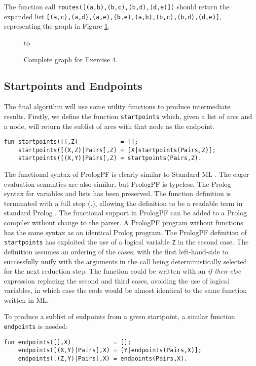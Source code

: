 The function call \texttt{routes([(a,b),(b,c),(b,d),(d,e)])} should return the
expanded list
\texttt{[(a,c),(a,d),(a,e),(b,e),(a,b),(b,c),(b,d),(d,e)]},\\
representing the graph in Figure \ref{ex4_2}.

\begin{figure}[htb]
\vspace{5mm} \hbox to 
\caption{Complete graph for Exercise 4.}
\vspace{5mm}
\label{ex4_2}
\end{figure}

\subsection{Startpoints and Endpoints}

The final algorithm will use some utility functions to produce intermediate results.
Firstly, we define the function \texttt{startpoints} which, given a list
of arcs and a node, will return the sublist of arcs with that node as the endpoint.
\begin{verbatim}
fun startpoints([],Z)            = [];
    startpoints([(X,Z)|Pairs],Z) = [X|startpoints(Pairs,Z)];
    startpoints([(X,Y)|Pairs],Z) = startpoints(Pairs,Z).
\end{verbatim}
The functional syntax of PrologPF is clearly similar to Standard ML \cite{MTH90}.  The
eager evaluation semantics are also similar, but PrologPF is typeless.  The Prolog syntax
for variables and lists has been preserved.
The function definition is terminated with a full stop (.), allowing
the definition to be a readable term in standard Prolog \cite{DEDC96}.  The functional
support in PrologPF can be added to a Prolog compiler without change to the parser.
A PrologPF program without functions has the same syntax as an identical
Prolog program.  The PrologPF definition of \texttt{startpoints} has exploited the
use of a logical variable \texttt{Z} in the second case. The definition assumes an
ordering of the cases, with the first left-hand-side to successfully unify with the 
arguments in the call being
deterministically selected for the next reduction step.  The function could be written
with an \textit{if-then-else} expression replacing the second and third cases, avoiding
the use of logical variables, in which case the code would be almost identical to the
same function written in ML. 

To produce a sublist of endpoints from a given startpoint, a similar function 
\texttt{endpoints} is needed:
\begin{verbatim}
fun endpoints([],X)            = [];
    endpoints([(X,Y)|Pairs],X) = [Y|endpoints(Pairs,X)];
    endpoints([(Z,Y)|Pairs],X) = endpoints(Pairs,X).
\end{verbatim}


